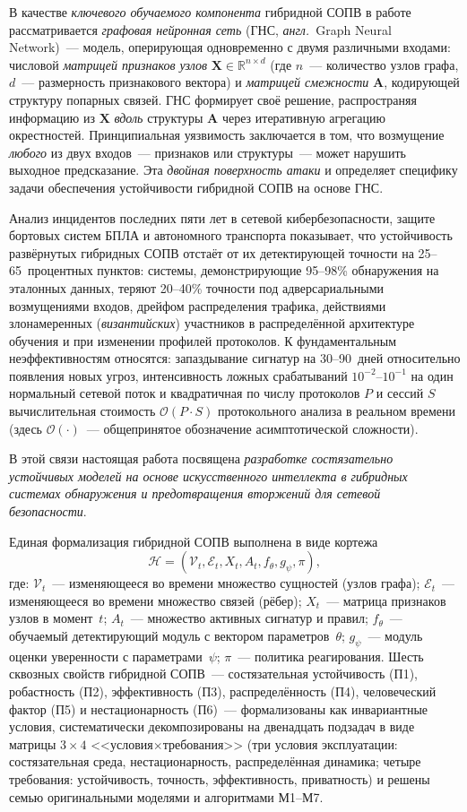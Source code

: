 \documentclass[12pt,a5paper]{article}
\begin{document}
В качестве \emph{ключевого обучаемого компонента} гибридной
СОПВ в работе рассматривается \emph{графовая нейронная сеть}
(ГНС, \emph{англ.}~Graph Neural Network)~--- модель,
оперирующая одновременно с двумя различными входами:
числовой \emph{матрицей признаков узлов}
$\mathbf{X}\in\mathbb{R}^{n\times d}$ (где $n$~--- количество
узлов графа, $d$~--- размерность признакового вектора) и
\emph{матрицей смежности} $\mathbf{A}$, кодирующей структуру
попарных связей. ГНС формирует своё решение, распространяя
информацию из $\mathbf{X}$ \emph{вдоль} структуры $\mathbf{A}$
через итеративную агрегацию окрестностей. Принципиальная
уязвимость заключается в том, что возмущение \emph{любого}
из двух входов~--- признаков или структуры~--- может нарушить
выходное предсказание. Эта \emph{двойная поверхность атаки}
и определяет специфику задачи обеспечения устойчивости
гибридной СОПВ на основе ГНС.

Анализ инцидентов последних пяти лет в сетевой
кибербезопасности, защите бортовых систем БПЛА и автономного
транспорта показывает, что устойчивость развёрнутых
гибридных СОПВ отстаёт от их детектирующей точности на
25--65~процентных пунктов: системы, демонстрирующие 95--98\%
обнаружения на эталонных данных, теряют 20--40\% точности под
адверсариальными возмущениями входов, дрейфом распределения
трафика, действиями злонамеренных (\emph{византийских})
участников в распределённой архитектуре обучения и при
изменении профилей протоколов. К фундаментальным
неэффективностям относятся: запаздывание сигнатур на
30--90~дней относительно появления новых угроз, интенсивность
ложных срабатываний $10^{-2}$--$10^{-1}$ на один нормальный
сетевой поток и квадратичная по числу протоколов $P$ и
сессий $S$ вычислительная стоимость
$\mathcal{O}(P\cdot S)$ протокольного анализа в реальном
времени (здесь $\mathcal{O}(\cdot)$~--- общепринятое
обозначение асимптотической сложности).

В этой связи настоящая работа посвящена \emph{разработке
состязательно устойчивых моделей на основе искусственного
интеллекта в гибридных системах обнаружения и предотвращения
вторжений для сетевой безопасности}.

Единая формализация гибридной СОПВ выполнена в виде кортежа
\[
\mathcal{H} = (\mathcal{V}_t, \mathcal{E}_t, X_t, A_t,
f_\theta, g_\psi, \pi),
\]
где: $\mathcal{V}_t$~--- изменяющееся во времени множество
сущностей (узлов графа); $\mathcal{E}_t$~--- изменяющееся
во времени множество связей (рёбер); $X_t$~--- матрица
признаков узлов в момент~$t$; $A_t$~--- множество активных
сигнатур и правил; $f_\theta$~--- обучаемый детектирующий
модуль с вектором параметров~$\theta$; $g_\psi$~--- модуль
оценки уверенности с параметрами~$\psi$; $\pi$~--- политика
реагирования. Шесть сквозных свойств гибридной СОПВ~---
состязательная устойчивость (П1), робастность (П2),
эффективность (П3), распределённость (П4), человеческий
фактор (П5) и нестационарность (П6)~--- формализованы как
инвариантные условия, систематически декомпозированы на
двенадцать подзадач в виде матрицы $3\times4$
<<условия$\times$требования>> (три условия эксплуатации:
состязательная среда, нестационарность, распределённая
динамика; четыре требования: устойчивость, точность,
эффективность, приватность) и решены семью оригинальными
моделями и алгоритмами М1--М7.
\end{document}
